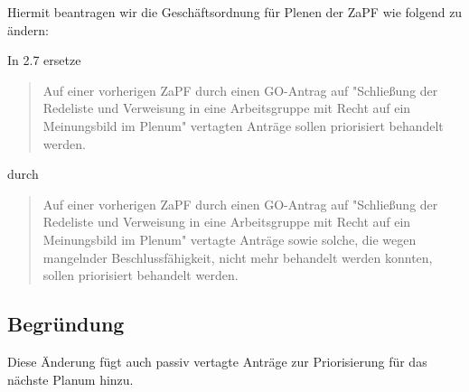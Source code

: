 \documentclass[draft,10pt,oneside]{scrartcl}
\begin{document}
Hiermit beantragen wir die Geschäftsordnung für Plenen der ZaPF wie folgend zu
ändern:

In 2.7 ersetze
\begin{quote}
	Auf einer vorherigen ZaPF durch einen GO-Antrag auf "Schließung der
	Redeliste und Verweisung in eine Arbeitsgruppe mit Recht auf ein
	Meinungsbild im Plenum" vertagten Anträge sollen priorisiert behandelt
	werden.
\end{quote}
durch
\begin{quote}
	Auf einer vorherigen ZaPF durch einen GO-Antrag auf "Schließung der
	Redeliste und Verweisung in eine Arbeitsgruppe mit Recht auf ein
	Meinungsbild im Plenum" vertagte Anträge sowie solche, die wegen mangelnder
	Beschlussfähigkeit, nicht mehr behandelt werden konnten, sollen priorisiert
	behandelt werden.
\end{quote}

\subsection*{Begründung}
Diese Änderung fügt auch passiv vertagte Anträge zur Priorisierung für das
nächste Planum hinzu.
\end{document}
